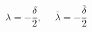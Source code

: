 \begin{equation}
\lambda = - \frac{\delta}{2},~~~~~~\bar{\lambda}= - \frac{\bar{\delta}}{2}
\end{equation}

